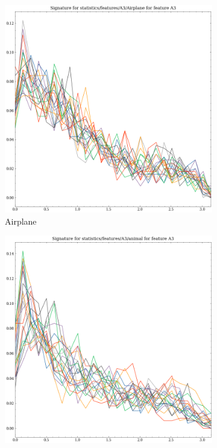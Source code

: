 \begin{figure}[ht]
    \centering
    \begin{subfigure}[b]{0.23\textwidth}
        \includegraphics[width=\textwidth]{assets/feature_extraction/A3/Airplane.png}
        \caption{Airplane}
        \label{fig:features-statistics-A3-a}    
    \end{subfigure}
    \hfill
    \begin{subfigure}[b]{0.23\textwidth}
        \includegraphics[width=\textwidth]{assets/feature_extraction/A3/animal.png}

\end{subfigure}
\end{figure}
